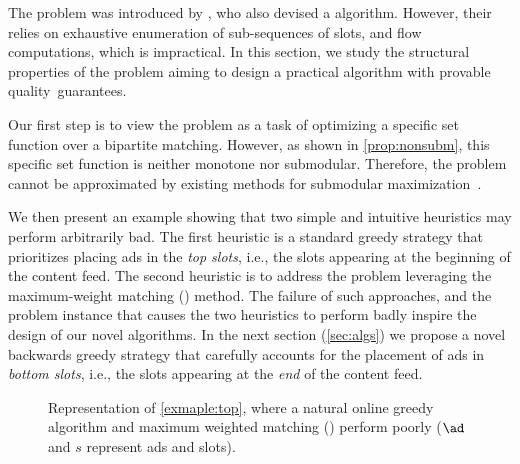 The \streamads problem was introduced by \citet{ieong2014advertising},
who also devised a \PTAS algorithm.
However, their \PTAS relies on exhaustive enumeration of sub-sequences of slots, and flow computations, which is impractical. %
In this section, we study the structural properties of the \streamads problem
aiming to design a practical algorithm with provable quality~guarantees.

Our first step is to view %
the \streamads problem
as a task of optimizing a specific set function over a bipartite matching.
However, as shown in \cref{prop:nonsubm}, 
this specific set function is neither monotone nor submodular.
Therefore, the problem cannot be approximated 
by existing methods for submodular maximization~\citep{buchbinder2018submodular}.

We then present an example showing that two simple and intuitive heuristics may perform arbitrarily bad.
The first heuristic is a standard greedy strategy that prioritizes placing ads in the \emph{top slots}, 
i.e., the slots appearing at the beginning of the content feed.
The second heuristic is to address the problem leveraging the %
maximum-weight matching (\mwm) method. 
The failure of such approaches, and the problem instance that causes the
two heuristics to perform badly inspire the design of our novel algorithms. 
In the next section	(\cref{sec:algs}) we 
propose
a novel backwards greedy strategy 
that carefully accounts for the placement of ads in \emph{bottom slots}, i.e., the slots appearing at the \emph{end} of the content feed.


\begin{figure}[t]
	\centering
	
	\caption{Representation of \cref{exmaple:top}, where %
		a natural online greedy algorithm and 
		maximum weighted matching (\mwm)
		perform poorly ($\ad$ and $s$ represent ads and slots).}\label{fig:badcase}
\end{figure}


